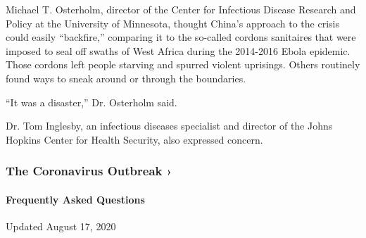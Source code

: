 Michael T. Osterholm, director of the Center for Infectious Disease
Research and Policy at the University of Minnesota, thought China's
approach to the crisis could easily ``backfire,'' comparing it to the
so-called cordons sanitaires that were imposed to seal off swaths of
West Africa during the 2014-2016 Ebola epidemic. Those cordons left
people starving and spurred violent uprisings. Others routinely found
ways to sneak around or through the boundaries.

``It was a disaster,'' Dr. Osterholm said.

Dr. Tom Inglesby, an infectious diseases specialist and director of the
Johns Hopkins Center for Health Security, also expressed concern.

\href{https://www.nytimes3xbfgragh.onion/news-event/coronavirus?action=click\&pgtype=Article\&state=default\&region=MAIN_CONTENT_3\&context=storylines_faq}{}

\hypertarget{the-coronavirus-outbreak-}{%
\subsubsection{The Coronavirus Outbreak
›}\label{the-coronavirus-outbreak-}}

\hypertarget{frequently-asked-questions}{%
\paragraph{Frequently Asked
Questions}\label{frequently-asked-questions}}

Updated August 17, 2020

